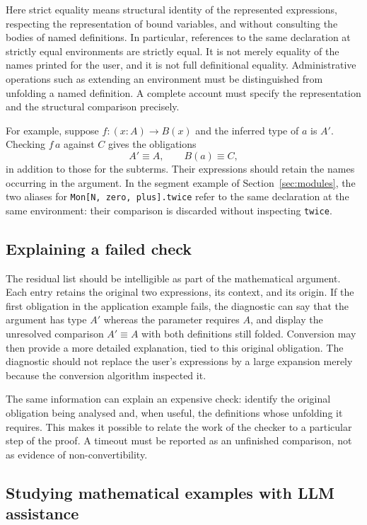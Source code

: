 \documentclass[11pt]{article}
\newcommand{\kw}[1]{\texttt{#1}}
\theoremstyle{remark}
\begin{document}
Here strict equality means structural identity of the represented
expressions, respecting the representation of bound variables, and
without consulting the bodies of named definitions. In particular,
references to the same declaration at strictly equal environments are
strictly equal. It is not merely equality of the names printed for the
user, and it is not full definitional equality. Administrative operations
such as extending an environment must be distinguished from unfolding a
named definition. A complete account must specify the representation and
the structural comparison precisely.

For example, suppose $f:(x:A)\to B(x)$ and the inferred type of $a$ is
$A'$. Checking $f\,a$ against $C$ gives the obligations
\[
  A'\equiv A,\qquad B(a)\equiv C,
\]
in addition to those for the subterms. Their expressions should retain
the names occurring in the argument. In the segment example of
Section~\ref{sec:modules}, the two aliases for
\kw{Mon[N, zero, plus].twice} refer to the same declaration at the same
environment: their comparison is discarded without inspecting
\kw{twice}.

\subsection{Explaining a failed check}

The residual list should be intelligible as part of the mathematical
argument. Each entry retains the original two expressions, its context,
and its origin. If the first obligation in the application example
fails, the diagnostic can say that the argument has type $A'$ whereas
the parameter requires $A$, and display the unresolved comparison
$A'\equiv A$ with both definitions still folded. Conversion may then
provide a more detailed explanation, tied to this original obligation.
The diagnostic should not replace the user's expressions by a large
expansion merely because the conversion algorithm inspected it.

The same information can explain an expensive check: identify the
original obligation being analysed and, when useful, the definitions
whose unfolding it requires. This makes it possible to relate the work
of the checker to a particular step of the proof. A timeout must be
reported as an unfinished comparison, not as evidence of non-convertibility.

\subsection{Studying mathematical examples with LLM assistance}
\end{document}
